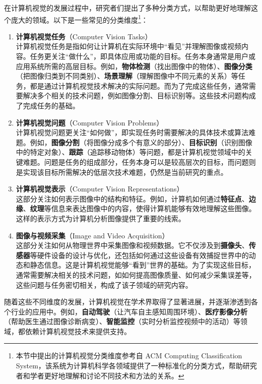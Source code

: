 在计算机视觉的发展过程中，研究者们提出了多种分类方式，以帮助更好地理解这个庞大的领域。以下是一些常见的分类维度\footnote{本节中提出的计算机视觉分类维度参考自 ACM Computing Classification System，该系统为计算机科学各领域提供了一种标准化的分类方式，帮助研究者和学者更好地理解和讨论不同技术和方法的关系。}：

\begin{enumerate}
    \item \textbf{计算机视觉任务}（Computer Vision Tasks） \\
    计算机视觉任务是指如何让计算机在实际环境中“看见”并理解图像或视频内容。任务更关注“做什么”，即具体应用或功能的目标。任务本身通常是用户或应用系统所需的高层目标。例如，\textbf{物体检测}（找出图像中的物体）、\textbf{图像分类}（把图像归类到不同类别）、\textbf{场景理解}（理解图像中不同元素的关系）等任务，都是通过计算机视觉技术解决的实际问题。而为了完成这些任务，通常需要解决多个相关的技术问题，例如图像分割、目标识别等。这些技术问题构成了完成任务的基础。

    \item \textbf{计算机视觉问题}（Computer Vision Problems） \\
    计算机视觉问题更关注“如何做”，即实现任务时需要解决的具体技术或算法难题。例如，\textbf{图像分割}（将图像分成多个有意义的部分）、\textbf{目标识别}（识别图像中的特定对象）、\textbf{跟踪}（追踪移动物体）等问题，都是计算机视觉领域中的关键难题。问题是任务的组成部分，任务本身可以是较高层次的目标，而问题则是实现该目标所需解决的低层次技术难题，仍然是当前研究的重点。
    
     \item \textbf{计算机视觉表示}（Computer Vision Representations） \\
    这部分关注如何表示图像中的结构和特征。例如，计算机如何通过\textbf{特征点}、\textbf{边缘}、\textbf{纹理}等信息来表达图像中的内容，使得计算机能够有效地理解这些图像。这样的表示方式为计算机分析图像提供了重要的线索。

    \item \textbf{图像与视频采集}（Image and Video Acquisition） \\
    这部分关注如何从物理世界中采集图像和视频数据。它不仅涉及到\textbf{摄像头}、\textbf{传感器}等硬件设备的设计与优化，还包括如何通过这些设备有效捕捉世界中的动态和静态信息。这是计算机视觉能够“看到”世界的基础。为了实现这些目标，通常需要解决相关的技术问题，如如何提高图像质量、如何减少采集误差等，这些问题与任务密切相关，构成了该子领域的研究内容。
\end{enumerate}


随着这些不同维度的发展，计算机视觉在学术界取得了显著进展，并逐渐渗透到各个行业的应用中。例如，\textbf{自动驾驶}（让汽车自主感知周围环境）、\textbf{医疗影像分析}（帮助医生通过图像诊断病变）、\textbf{智能监控}（实时分析监控视频中的活动）等领域，都依赖计算机视觉技术来提供支持。

